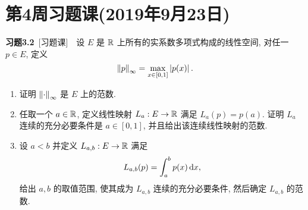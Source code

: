 \section{第4周习题课(2019年9月23日)}

	\textbf{习题3.2}\ [习题课]\ \ 设 $ E $ 是 $ \mathbb{R} $ 上所有的实系数多项式构成的线性空间, 对任一 $ p\in E $, 定义
	\[
		\left\| p \right\|_{\infty}=\max_{x\in[0, 1]}\left| p(x) \right| .
	\]
	\begin{enumerate}[(1)]
		\item 证明 $ \left\| \cdot \right\|_{\infty} $ 是 $ E $ 上的范数.
		\item 任取一个 $ a\in\mathbb{R} $, 定义线性映射 $ L_{a}:E\to \mathbb{R} $ 满足 $ L_{a}(p)=p(a) $. 证明 $ L_{a} $ 连续的充分必要条件是 $ a\in[0, 1] $, 并且给出该连续线性映射的范数.
		\item 设 $ a<b $ 并定义 $ L_{a, b}:E\to \mathbb{R} $ 满足
		\[
			L_{a, b}(p)=\int_{a}^{b}p(x)\,\mathrm{d} x,
		\]
		给出 $ a, b $ 的取值范围, 使其成为 $ L_{a, b} $ 连续的充分必要条件, 然后确定 $ L_{a, b} $ 的范数.
	\end{enumerate}

